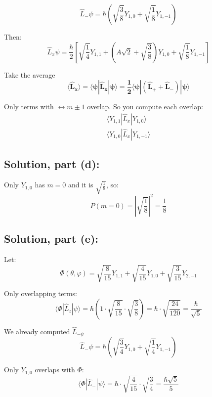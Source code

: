 \documentclass[12pt]{article}
\begin{document}
        \[
            \hat{L}_- \psi = \hbar \left( \sqrt{\frac{3}{8}} Y_{1,0} + \sqrt{\frac{1}{8}} Y_{1,-1} \right)
        \]

        Then:
        \[
            \hat{L}_x \psi = \frac{\hbar}{2} \left[
            \sqrt{\frac{1}{4}} Y_{1,1} + (A \sqrt{2} + \sqrt{\frac{3}{8}}) Y_{1,0} + \sqrt{\frac{1}{8}} Y_{1,-1}
            \right]
        \]

        Take the average
        \[
            \boldsymbol{\boxed{\langle \hat{L}_x \rangle = \langle \psi | \hat{L}_x | \psi \rangle = \frac{1}{2} \langle \psi | (\hat{L}_+ + \hat{L}_-) | \psi \rangle}}
        \]

        Only terms with $\leftrightarrow m \pm 1$ overlap. So you compute each overlap:
        \begin{align*}
            \langle Y_{1,1} | \hat{L}_x | Y_{1,0} \rangle \\
            \langle Y_{1,0} | \hat{L}_x | Y_{1,-1} \rangle
        \end{align*}

    \subsection{Solution, part (d):}
        Only $Y_{1,0}$ has $m=0$ and it is $\sqrt{\frac{1}{8}}$, so:
        \[
            P(m=0) = \left| \sqrt{\frac{1}{8}} \right|^2 = \boxed{\frac{1}{8}}
        \]

    \subsection{Solution, part (e):}
        Let:
        \[
            \Phi(\theta, \varphi) =
            \sqrt{\frac{8}{15}} Y_{1,1} + \sqrt{\frac{4}{15}} Y_{1,0} + \sqrt{\frac{3}{15}} Y_{2,-1}
        \]

        Only overlapping terms:
        \[
            \langle \Phi | \hat{L}_z | \psi \rangle =
            \hbar \left( 1 \cdot \sqrt{\frac{8}{15}} \cdot \sqrt{\frac{3}{8}} \right) = \hbar \cdot \sqrt{\frac{24}{120}} = \frac{\hbar}{\sqrt{5}}
        \]
        
        We already computed $\hat{L}_{-\psi}$
        \[
            \hat{L}_- \psi = \hbar \left( \sqrt{\frac{3}{4}} Y_{1,0} + \sqrt{\frac{1}{4}} Y_{1,-1} \right)
        \]
        
        Only $Y_{1,0}$ overlaps with $\Phi$:
        \[
            \langle \Phi | \hat{L}_- | \psi \rangle = \hbar \cdot \sqrt{\frac{4}{15}} \cdot \sqrt{\frac{3}{4}} = \boxed{\frac{\hbar \sqrt{5}}{5}}
        \]
\end{document}

